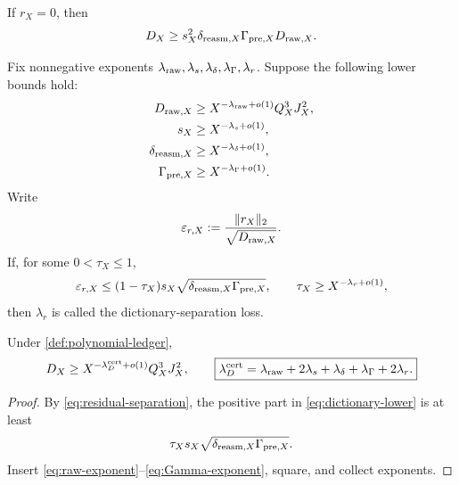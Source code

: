 \begin{corollary}
\label{cor:exact-dictionary}
If \(r_X=0\), then
\begin{equation}
 D_X
 \ge
 s_X^2\delta_{{\rm reasm},X}
 \Gamma_{{\rm pre},X}D_{{\rm raw},X}.
 \label{eq:exact-dictionary-energy}
\end{equation}
\end{corollary}

\begin{definition}
\label{def:polynomial-ledger}
Fix nonnegative exponents
\(\lambda_{\rm raw},\lambda_s,\lambda_\delta,\lambda_\Gamma,
\lambda_r\).  Suppose the following lower bounds hold:
\begin{align}
 D_{{\rm raw},X}
 &\ge X^{-\lambda_{\rm raw}+o(1)}Q_X^3J_X^2,
 \label{eq:raw-exponent}\\
 s_X
 &\ge X^{-\lambda_s+o(1)},
 \label{eq:s-exponent}\\
 \delta_{{\rm reasm},X}
 &\ge X^{-\lambda_\delta+o(1)},
 \label{eq:delta-exponent}\\
 \Gamma_{{\rm pre},X}
 &\ge X^{-\lambda_\Gamma+o(1)}.
 \label{eq:Gamma-exponent}
\end{align}
Write
\begin{equation}
 \varepsilon_{r,X}
 :=\frac{\|r_X\|_2}{\sqrt{D_{{\rm raw},X}}}.
 \label{eq:normalized-residual}
\end{equation}
If, for some \(0<\tau_X\le1\),
\begin{equation}
 \varepsilon_{r,X}
 \le
 (1-\tau_X)
 s_X\sqrt{\delta_{{\rm reasm},X}\Gamma_{{\rm pre},X}},
 \qquad
 \tau_X\ge X^{-\lambda_r+o(1)},
 \label{eq:residual-separation}
\end{equation}
then \(\lambda_r\) is called the dictionary-separation loss.
\end{definition}

\begin{corollary}
\label{cor:lambda-D}
Under \cref{def:polynomial-ledger},
\begin{equation}
 D_X
 \ge
 X^{-\lambda_D^{\rm cert}+o(1)}Q_X^3J_X^2,
 \qquad
 \boxed{
 \lambda_D^{\rm cert}
 =
 \lambda_{\rm raw}
 +2\lambda_s+\lambda_\delta+\lambda_\Gamma+2\lambda_r.}
 \label{eq:lambda-D-ledger}
\end{equation}
\end{corollary}

\begin{proof}
By \eqref{eq:residual-separation}, the positive part in
\eqref{eq:dictionary-lower} is at least
\[
 \tau_Xs_X
 \sqrt{\delta_{{\rm reasm},X}\Gamma_{{\rm pre},X}}.
\]
Insert \eqref{eq:raw-exponent}--\eqref{eq:Gamma-exponent}, square,
and collect exponents.
\end{proof}

